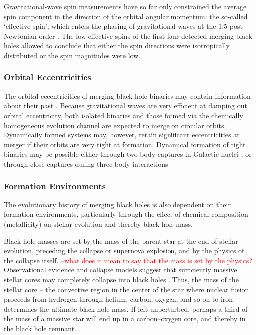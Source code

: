 \documentclass[iop,onecolumn]{revtex4}
\begin{document}
Gravitational-wave spin measurements have so far only constrained the average spin component in the direction of the orbital angular momentum: the so-called `effective spin', which enters the phasing of gravitational waves at the 1.5 post-Newtonian order \citep{PoissonWill:1995}.  The low effective spins of the first four detected merging black holes allowed \citet{Farr:2017} to conclude that either the spin directions were isotropically distributed or the spin magnitudes were low.

\subsubsection{Orbital Eccentricities}
	The orbital eccentricities of merging black hole binaries may contain information about their past \citep{MandelOShaughnessy:2010}. Because gravitational waves are very efficient at damping out orbital eccentricity, both isolated binaries and those formed via the chemically homogeneous evolution channel are expected to merge on circular orbits. Dynamically formed systems may, however, retain significant eccentricities at merger if their orbits are very tight at formation. Dynamical formation of tight binaries may be possible either through two-body captures in Galactic nuclei \citep{OLeary:2008} \citep[but see][]{Tsang:2013}, or through close captures during three-body interactions \citep{Samsing:2014, Rodriguez:2018}. 


\subsubsection{Formation Environments}
\label{environ}
The evolutionary history of merging black holes is also dependent on their formation environments, particularly through the effect of chemical composition (metallicity) on stellar evolution and thereby black hole mass.

Black hole masses are set by the mass of the parent star at the end of stellar evolution, preceding the collapse or supernova explosion, and by the physics of the collapse itself. \textcolor{red}{--what does it mean to say that the mass is set by the physics?} Observational evidence and collapse models suggest that sufficiently massive stellar cores may completely collapse into black holes \citep[for a review, see][]{Mirabel:2016}. Thus, the mass of the stellar core -- the convective region in the center of the star where nuclear fusion proceeds from hydrogen through helium, carbon, oxygen, and so on to iron -- determines the ultimate black hole mass.  If left unperturbed, perhaps a third of the mass of a massive star will end up in a carbon--oxygen core, and thereby in the black hole remnant.
\end{document}
